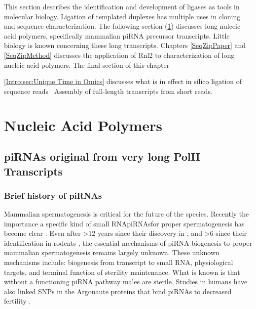     This section describes the identification and development of ligases as tools in molecular biology. Ligation of templated duplexes has multiple uses in cloning and sequence characterization. The following section (\ref{Intro:sec:Nucleic Acid Polymers}) discusses long nulceic acid polymers, specifically mammalian piRNA precursor transcripts. Little biology is known concerning these long transcripts. Chapters \ref{SeqZipPaper} and \ref{SeqZipMethod} discusses the application of Rnl2 to characterization of long nucleic acid polymers. The final section of this chapter {\ref{Intro:sec:Unique Time in Omics} discusses what is in effect in silico ligation of sequence reads\textendash~ Assembly of full-length transcripts from short reads.

\section{Nucleic Acid Polymers}\label{Intro:sec:Nucleic Acid Polymers}

  \subsection{piRNAs original from very long PolII Transcripts}\label{Intro:subsec:Intro:Mouse piRNAs}

    \subsubsection{Brief history of piRNAs}


      Mammalian spermatogenesis is critical for the future of the species. Recently the importance a specific kind of small RNA\textemdash piRNAs\textemdash for proper spermatogenesis has become clear \citep{Siomi2011}. Even after >12 years since their discovery in \flies \citep{Aravin2001}, and >6 since their identification in rodents \citep{Girard2006, Lau2006}, the essential mechanisms of piRNA biogenesis to proper mammalian spermatogenesis remains largely unknown. These unknown mechanisms include: biogenesis from transcript to small RNA, physiological targets, and terminal function of sterility maintenance. What is known is that without a functioning piRNA pathway males are sterile. Studies in humans have also linked SNPs in the Argonaute proteins that bind piRNAs to decreased fertility \citep{Gu2010a}. 

}
